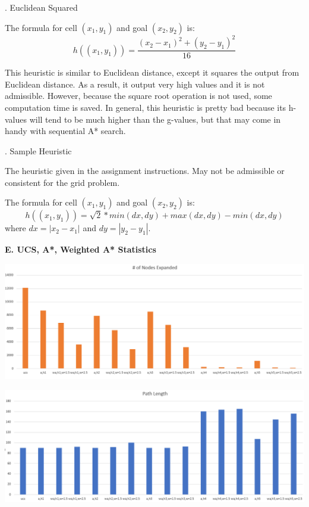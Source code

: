 \documentclass[12pt, letterpaper]{article}
\begin{document}
\bigskip
{}. Euclidean Squared

The formula for cell $(x_1, y_1)$ and goal $(x_2, y_2)$ is:
$$h((x_1,y_1)) = \frac{(x_2-x_1)^2 + (y_2-y_1)^2}{16}$$

This heuristic is similar to Euclidean distance, except it squares the output from Euclidean distance. As a result, it output very high values and it is not admissible. However, because the square root operation is not used, some computation time is saved. In general, this heuristic is pretty bad because its h-values will tend to be much higher than the g-values, but that may come in handy with sequential A* search.

\bigskip
{}. Sample Heuristic

The heuristic given in the assignment instructions. May not be admissible or consistent for the grid problem. 

The formula for cell $(x_1, y_1)$ and goal $(x_2, y_2)$ is:
$$h((x_1,y_1)) = \sqrt{2} * min(dx, dy) + max(dx, dy) - min(dx, dy)$$
where $dx = |x_2 - x_1|$ and $dy = |y_2 - y_1|$. 

\pagebreak %

\noindent \textbf{E. UCS, A*, Weighted A* Statistics}

\noindent \includegraphics[scale=0.5]{"avg-nodeexpanded"}

\medskip

\noindent \includegraphics[scale=0.5]{"avg-pathlength"}
\end{document}
